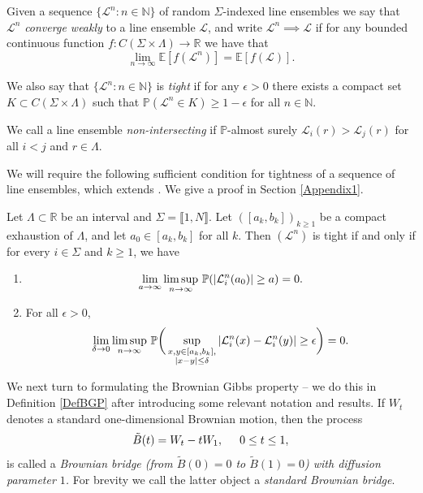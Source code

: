 \begin{definition}
Given a sequence $\{ \mathcal{L}^n: n \in \mathbb{N} \}$ of random $\Sigma$-indexed line ensembles we say that $\mathcal{L}^n$ {\em converge weakly} to a line ensemble $\mathcal{L}$, and write $\mathcal{L}^n \implies \mathcal{L}$ if for any bounded continuous function $f: C (\Sigma \times \Lambda) \rightarrow \mathbb{R}$ we have that 
$$\lim_{n \rightarrow \infty} \mathbb{E} \left[ f(\mathcal{L}^n) \right] = \mathbb{E} \left[ f(\mathcal{L}) \right].$$

We also say that $\{ \mathcal{L}^n: n \in \mathbb{N} \}$ is {\em tight} if for any $\epsilon > 0$ there exists a compact set $K \subset C (\Sigma \times \Lambda)$ such that $\mathbb{P}(\mathcal{L}^n \in K) \geq 1- \epsilon$ for all $n \in \mathbb{N}$.

We call a line ensemble {\em non-intersecting} if $\mathbb{P}$-almost surely $\mathcal{L}_i(r) > \mathcal{L}_j(r)$  for all $i < j$ and $r \in \Lambda$.
\end{definition}

We will require the following sufficient condition for tightness of a sequence of line ensembles, which extends \cite[Theorem 7.3]{Billing}. We give a proof in Section \ref{Appendix1}.

\begin{lemma}\label{2Tight}
	Let $\Lambda\subset\mathbb{R}$ be an interval and $\Sigma = \llbracket 1, N\rrbracket$. Let $([a_k,b_k])_{k\geq 1}$ be a compact exhaustion of $\Lambda$, and let $a_0 \in [a_k,b_k]$ for all $k$. Then $(\mathcal{L}^n)$ is tight if and only if for every $i\in\Sigma$ and $k\geq 1$, we have
	\begin{enumerate}[label=(\roman*)]
		
		\item 
		\[
		\lim_{a\to\infty} \limsup_{n\to\infty}\, \mathbb{P}(|\mathcal{L}^n_i(a_0)|\geq a) = 0.
		\]
		
		\item For all $\epsilon>0$,
		\[
		\lim_{\delta\to 0} \limsup_{n\to\infty}\, \mathbb{P}\bigg(\sup_{\substack{x,y\in [a_k,b_k], \\ |x-y|\leq\delta}} |\mathcal{L}^n_i(x) - \mathcal{L}^n_i(y)| \geq \epsilon\bigg) = 0.
		\]
		
	\end{enumerate}
\end{lemma}

We next turn to formulating the Brownian Gibbs property -- we do this in Definition \ref{DefBGP} after introducing some relevant notation and results. If $W_t$ denotes a standard one-dimensional Brownian motion, then the process
$$\tilde{B}(t) =  W_t - t W_1, \hspace{5mm} 0 \leq t \leq 1,$$
is called a {\em Brownian bridge (from $\tilde{B}(0) = 0$ to $\tilde{B}(1) = 0 $) with diffusion parameter $1$.} For brevity we call the latter object a {\em standard Brownian bridge}.

